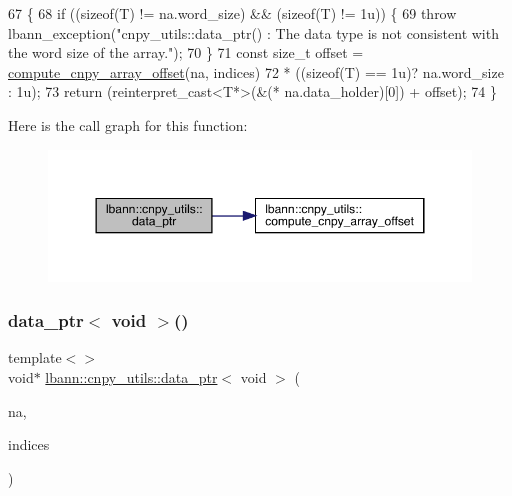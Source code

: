 \begin{DoxyCode}
67                                                                             \{
68   \textcolor{keywordflow}{if} ((\textcolor{keyword}{sizeof}(T) != na.word\_size) && (\textcolor{keyword}{sizeof}(T) != 1u)) \{
69     \textcolor{keywordflow}{throw} lbann\_exception(\textcolor{stringliteral}{"cnpy\_utils::data\_ptr() : The data type is not consistent with the word size of
       the array."});
70   \}
71   \textcolor{keyword}{const} \textcolor{keywordtype}{size\_t} offset = \hyperlink{namespacelbann_1_1cnpy__utils_a39fd207d94d1333e6379c53423b6f1a1}{compute\_cnpy\_array\_offset}(na, indices)
72                         * ((\textcolor{keyword}{sizeof}(T) == 1u)? na.word\_size : 1u);
73   \textcolor{keywordflow}{return} (reinterpret\_cast<T*>(&(* na.data\_holder)[0]) + offset);
74 \}
\end{DoxyCode}
Here is the call graph for this function\+:\nopagebreak
\begin{figure}[H]
\begin{center}
\leavevmode
\includegraphics[width=350pt]{namespacelbann_1_1cnpy__utils_a348a4aa859715e5859ddd1a5e3a269c9_cgraph}
\end{center}
\end{figure}
\mbox{\label{namespacelbann_1_1cnpy__utils_aba43b785d14caa5c5df74674f10f0dd8}} 
\subsubsection{\texorpdfstring{data\+\_\+ptr$<$ void $>$()}{data\_ptr< void >()}}
{\footnotesize\ttfamily template$<$$>$ \\
void$\ast$ \hyperlink{namespacelbann_1_1cnpy__utils_a348a4aa859715e5859ddd1a5e3a269c9}{lbann\+::cnpy\+\_\+utils\+::data\+\_\+ptr}$<$ void $>$ (\begin{DoxyParamCaption}\item[{const cnpy\+::\+Npy\+Array \&}]{na,  }\item[{const std\+::vector$<$ size\+\_\+t $>$}]{indices }\end{DoxyParamCaption})\hspace{0.3cm}{\ttfamily [inline]}}



